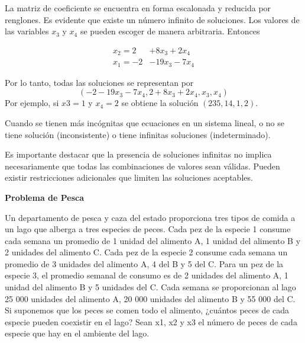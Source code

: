 \documentclass{article}
\begin{document}
La matriz de coeficiente se encuentra en forma escalonada y reducida por renglones. Es evidente que existe un número infinito de soluciones. Los valores de las variables $x_3$ y $x_4$ se pueden escoger de manera arbitraria. Entonces 

\begin{equation*}
    \begin{aligned}
        x_2 = 2 & +8x_3 + 2x_4\\
        x_1 =-2 & -19x_3-7x_4 
    \end{aligned}
\end{equation*}

Por lo tanto, todas las soluciones se representan por $$(-2 -19x_3 -7x_4, 2 + 8x_3 + 2x_4, x_3, x_4)$$ Por ejemplo, si $x3 = 1$ y $x_4 = 2$ se obtiene la solución $(235, 14, 1, 2)$.

\begin{tcolorbox}[colback=green!20!white,colframe=green!80!black,title=Soluciones en un Sistema con más Incógnitas que Ecuaciones]
    Cuando se tienen más incógnitas que ecuaciones en un sistema lineal, o no se tiene solución (inconsistente) o tiene infinitas soluciones (indeterminado).

    Es importante destacar que la presencia de soluciones infinitas no implica necesariamente que todas las combinaciones de valores sean válidas. Pueden existir restricciones adicionales que limiten las soluciones aceptables.
\end{tcolorbox}

\begin{large}
    \textbf{Problema de Pesca}
\end{large}

Un departamento de pesca y caza del estado proporciona tres tipos de comida a un lago que alberga a tres especies de peces. Cada pez de la especie 1 consume cada semana un promedio de 1 unidad del alimento A, 1 unidad del alimento B y 2 unidades del alimento C. Cada pez de la especie 2 consume cada semana un promedio de 3 unidades del alimento A, 4 del B y 5 del C. Para un pez de la especie 3, el promedio semanal de consumo es de 2 unidades del alimento A, 1 unidad del alimento B y 5 unidades del C. Cada semana se proporcionan al lago 25 000 unidades del alimento A, 20 000 unidades del alimento B y 55 000 del C. Si suponemos que los peces se comen todo el alimento, ¿cuántos peces de cada especie pueden coexistir en el lago? Sean x1, x2 y x3 el número de peces de cada especie que hay en el ambiente del lago.
\end{document}
